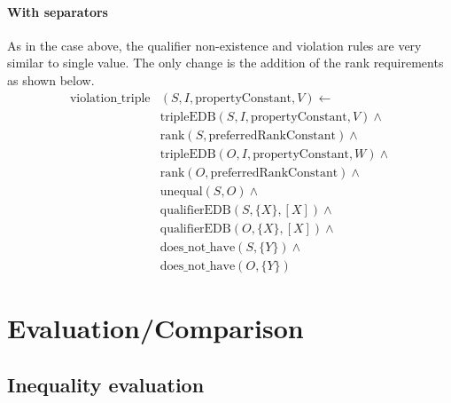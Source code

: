 \documentclass[hyperref,bachelorofscience,fleqn]{cgvpub}
\begin{document}
\subsubsection{With separators}
As in the case above, the qualifier non-existence and violation rules are very similar to single value. The only change is the addition of the rank requirements as shown below.
\begin{equation*}
\begin{split}
\text{violation\_triple}&(S, I, \text{propertyConstant}, V) \leftarrow \\
&\text{tripleEDB}(S, I, \text{propertyConstant}, V) \wedge \\
&\text{rank}(S, \text{preferredRankConstant}) \wedge \\
&\text{tripleEDB}(O, I, \text{propertyConstant}, W) \wedge \\
&\text{rank}(O, \text{preferredRankConstant}) \wedge \\
&\text{unequal}(S, O) \wedge \\
&\text{qualifierEDB}(S, \{X\}, [X]) \wedge \\
&\text{qualifierEDB}(O, \{X\}, [X]) \wedge \\
&\text{does\_not\_have}(S, \{Y\}) \wedge \\
&\text{does\_not\_have}(O, \{Y\})
\end{split}
\end{equation*}


\chapter{Evaluation/Comparison}

\section{Inequality evaluation}\label{sec_inequality_evaluation}
\end{document}
